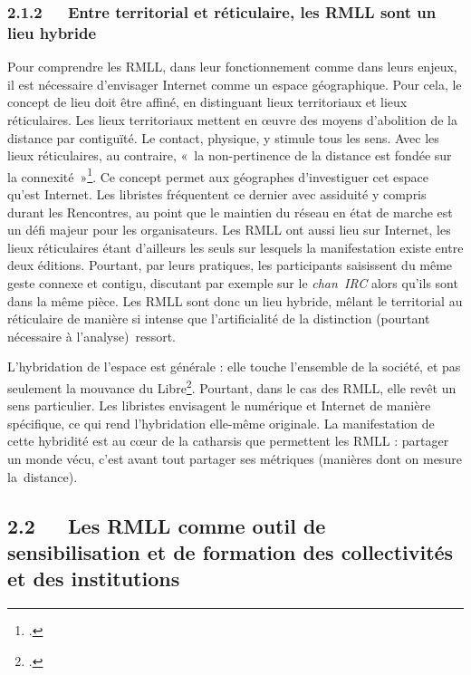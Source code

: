 \documentclass{FramateX}
\begin{document}
\begin{refsection}
\subsubsection*{2.1.2~~~Entre territorial et réticulaire, les RMLL sont un lieu hybride}
{}

Pour comprendre les RMLL, dans leur fonctionnement comme dans leurs
enjeux, il est nécessaire d'envisager Internet comme un espace
géographique. Pour cela, le concept de lieu doit être affiné, en
distinguant lieux territoriaux et lieux réticulaires. Les lieux
territoriaux mettent en œuvre des moyens d'abolition de la distance par
contiguïté. Le contact, physique, y stimule tous les sens. Avec les
lieux réticulaires, au contraire, «~la
non-pertinence de la distance est fondée sur la
connexité~»\footnote{\cite[p.~191]{Beaude2008}.}. Ce concept permet aux géographes d'investiguer cet espace
qu'est Internet. Les libristes fréquentent ce dernier avec assiduité y
compris durant les Rencontres, au point que le maintien du réseau en
état de marche est un défi majeur pour les organisateurs. Les RMLL ont
aussi lieu sur Internet, les lieux réticulaires étant d'ailleurs les
seuls sur lesquels la manifestation existe entre deux éditions.
Pourtant, par leurs pratiques, les participants saisissent du même
geste connexe et contigu, discutant par exemple sur le \textit{chan~IRC}
alors qu'ils sont dans la même pièce. Les RMLL sont donc un lieu
hybride, mêlant le territorial au réticulaire de manière si intense que
l'artificialité de la distinction (pourtant nécessaire à
l'analyse)~ressort.

L'hybridation de l'espace est générale : elle touche l'ensemble de la
société, et pas seulement la mouvance du
Libre\footnote{\cite[p.~209]{beaudeinternet2012}.}. Pourtant, dans le cas des RMLL, elle revêt un sens
particulier. Les libristes envisagent le numérique et Internet de
manière spécifique, ce qui rend l'hybridation elle-même originale. La
manifestation de cette hybridité est au cœur de la catharsis que
permettent les RMLL : partager un monde vécu, c'est avant tout partager
ses métriques (manières dont on mesure la~distance).

\subsection*{2.2~~~Les RMLL comme outil de sensibilisation et de formation des collectivités et des institutions}
{}


\end{refsection}
\end{document}
